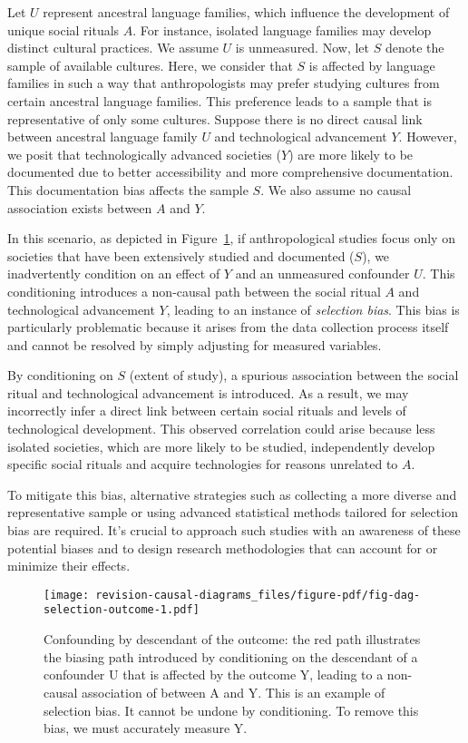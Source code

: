 \documentclass[
  singlecolumn,
  9pt]{article}
\begin{document}
Let \(U\) represent ancestral language families, which influence the
development of unique social rituals \(A\). For instance, isolated
language families may develop distinct cultural practices. We assume
\(U\) is unmeasured. Now, let \(S\) denote the sample of available
cultures. Here, we consider that \(S\) is affected by language families
in such a way that anthropologists may prefer studying cultures from
certain ancestral language families. This preference leads to a sample
that is representative of only some cultures. Suppose there is no direct
causal link between ancestral language family \(U\) and technological
advancement \(Y\). However, we posit that technologically advanced
societies (\(Y\)) are more likely to be documented due to better
accessibility and more comprehensive documentation. This documentation
bias affects the sample \(S\). We also assume no causal association
exists between \(A\) and \(Y\).

In this scenario, as depicted in Figure~\ref{fig-dag-selection-outcome},
if anthropological studies focus only on societies that have been
extensively studied and documented (\(S\)), we inadvertently condition
on an effect of \(Y\) and an unmeasured confounder \(U\). This
conditioning introduces a non-causal path between the social ritual
\(A\) and technological advancement \(Y\), leading to an instance of
\emph{selection bias}. This bias is particularly problematic because it
arises from the data collection process itself and cannot be resolved by
simply adjusting for measured variables.

By conditioning on \(S\) (extent of study), a spurious association
between the social ritual and technological advancement is introduced.
As a result, we may incorrectly infer a direct link between certain
social rituals and levels of technological development. This observed
correlation could arise because less isolated societies, which are more
likely to be studied, independently develop specific social rituals and
acquire technologies for reasons unrelated to \(A\).

To mitigate this bias, alternative strategies such as collecting a more
diverse and representative sample or using advanced statistical methods
tailored for selection bias are required. It's crucial to approach such
studies with an awareness of these potential biases and to design
research methodologies that can account for or minimize their effects.

\begin{figure}

{\centering \texttt{[image: revision-causal-diagrams\_files/figure-pdf/fig-dag-selection-outcome-1.pdf]}

}

\caption{\label{fig-dag-selection-outcome}Confounding by descendant of
the outcome: the red path illustrates the biasing path introduced by
conditioning on the descendant of a confounder U that is affected by the
outcome Y, leading to a non-causal association of between A and Y. This
is an example of selection bias. It cannot be undone by conditioning. To
remove this bias, we must accurately measure Y.}

\end{figure}
\end{document}
